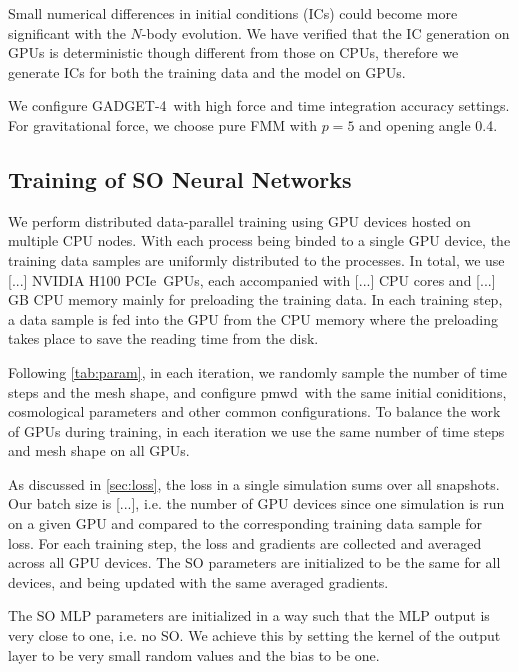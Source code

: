 \documentclass[modern, trackchanges, dvipsnames]{aastex631}
\newcommand{\pmwd}{{\usefont{T1}{nova}{m}{sl}pmwd}}
\newcommand{\GADGET}{{{\fontsize{10pt}{12pt}\selectfont GADGET}-4}}
\newcommand{\GPU}{NVIDIA H100 PCIe}  %
\begin{document}
Small numerical differences in initial conditions (ICs) could become more
significant with the $N$-body evolution.
We have verified that the IC generation on GPUs is deterministic though
different from those on CPUs, therefore we generate ICs for both the training
data and the model on GPUs.

We configure \GADGET\ with high force and time integration accuracy
settings.
For gravitational force, we choose pure FMM with $p=5$ and opening angle
0.4.


\vspace{1em}
\subsection{Training of SO Neural Networks}

We perform distributed data-parallel training using GPU devices hosted on
multiple CPU nodes.
With each process being binded to a single GPU device, the training data samples
are uniformly distributed to the processes.
In total, we use [...] \GPU\ GPUs, each accompanied with [...] CPU cores and
[...] GB CPU memory mainly for preloading the training data.
In each training step, a data sample is fed into the GPU from the CPU memory
where the preloading takes place to save the reading time from the disk.

Following \autoref{tab:param}, in each iteration, we randomly sample the number
of time steps and the mesh shape, and configure \pmwd\ with the same initial
coniditions, cosmological parameters and other common configurations.
To balance the work of GPUs during training, in each iteration we use
the same number of time steps and mesh shape on all GPUs.

As discussed in \autoref{sec:loss}, the loss in a single simulation sums over
all snapshots.
Our batch size is [...], i.e. the number of GPU devices since one simulation is
run on a given GPU and compared to the corresponding training data sample for
loss.
For each training step, the loss and gradients are collected and averaged across
all GPU devices.
The SO parameters are initialized to be the same for all devices, and being
updated with the same averaged gradients.

The SO MLP parameters are initialized in a way such that the MLP output is very
close to one, i.e. no SO.
We achieve this by setting the kernel of the output layer to be very small
random values and the bias to be one.
\end{document}
